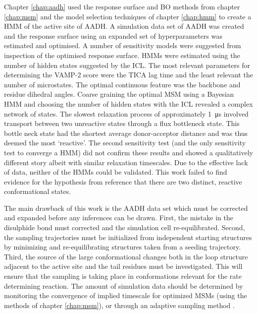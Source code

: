 Chapter \ref{chap:aadh} used the response surface and BO methods from chapter \ref{chap:msm} and the model selection techniques of chapter \ref{chap:hmm} to create a HMM of the active site of AADH. A simulation data set of AADH was created and the response surface using an expanded set of hyperparameters was estimated and optimised. A number of sensitivity models were suggested from inspection of the optimised response surface. HMMs were estimated using the number of hidden states suggested by the ICL. The most relevant parameters for determining the VAMP-2 score were the TICA lag time and the least relevant the number of microstates.  The optimal continuous feature was the backbone and residue dihedral angles. Coarse graining the optimal MSM using a Bayesian HMM and choosing the number of hidden states with the ICL revealed a complex network of states. The slowest relaxation process of approximately \SI{1}{\micro\second} involved transport between two unreactive states through a flux bottleneck state. This bottle neck state had the shortest average donor-acceptor distance and was thus deemed the most `reactive'. The second sensitivity test (and the only sensitivity test to converge a HMM) did not confirm these results and showed a qualitatively different story albeit with similar relaxation timescales. Due to the effective lack of data, neither of the HMMs could be validated. This work failed to find evidence for the hypothesis from reference \cite{glowackiTakingOckhamRazor2012b} that there are two distinct, reactive conformational states. 

The main drawback of this work is the AADH data set which must be corrected and expanded before any inferences can be drawn. First, the mistake in the disulphide bond must corrected and the simulation cell re-equilibrated. Second, the sampling trajectories must be initialized from independent starting structures by minimizing and re-equilibrating structures taken from a seeding trajectory. Third, the source of the large conformational changes both in the loop structure adjacent to the active site and the tail residues must be investigated. This will ensure that the sampling is taking place in  conformations relevant for the rate determining reaction. The amount of simulation data should be determined by monitoring the convergence of implied timescale  for optimized MSMs (using the methods of chapter \ref{chap:msm}), or through an adaptive sampling method \cite{doerrOntheFlyLearningSampling2014}. 

